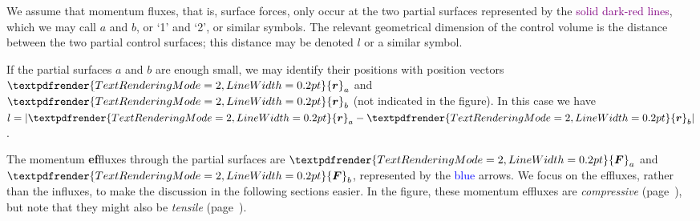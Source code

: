 \documentclass[a4paper,12pt,%
onecolumn,oneside,%
british%
]{memoir}
\renewcommand*{\bm}[1]{\textpdfrender{TextRenderingMode=2,LineWidth=0.2pt}{\boldsymbol{#1}}}
\DeclarePairedDelimiter\abs{\lvert}{\rvert}
\renewcommand*{\|}[1][]{\nonscript\:#1\vert\nonscript\:\mathopen{}}
\newcommand*{\yr}{\bm{r}}
\newcommand*{\yra}{\yr_{a}}
\newcommand*{\yrb}{\yr_{b}}
\newcommand*{\yle}{l}
\newcommand*{\yF}{\bm{F}}
\newcommand*{\yFa}{\yF_{a}}
\newcommand*{\yFb}{\yF_{b}}
\begin{document}
We assume that momentum fluxes, that is, surface forces, only occur at the two partial surfaces represented by the \textcolor{purple}{solid dark-red lines}, which we may call $a$ and $b$, or \enquote*{1} and \enquote*{2}, or similar symbols. The relevant geometrical dimension of the control volume is the distance between the two partial control surfaces; this distance may be denoted $\yle$ or a similar symbol.

If the partial surfaces $a$ and $b$ are enough small, we may identify their positions with position vectors $\yra$ and $\yrb$ (not indicated in the figure). In this case we have $\yle = \abs{\yra - \yrb}$.

The momentum \textbf{ef}fluxes through the partial surfaces are $\yFa$ and $\yFb$, represented by the \textcolor{blue}{blue} arrows. We focus on the effluxes, rather than the influxes, to make the discussion in the following sections easier. In the figure, these momentum effluxes are \emph{compressive} (\enspace page~\pageref{sec:pressure}), but note that they might also be \emph{tensile} (\enspace page~\pageref{sec:tension}).


\medskip
\end{document}
